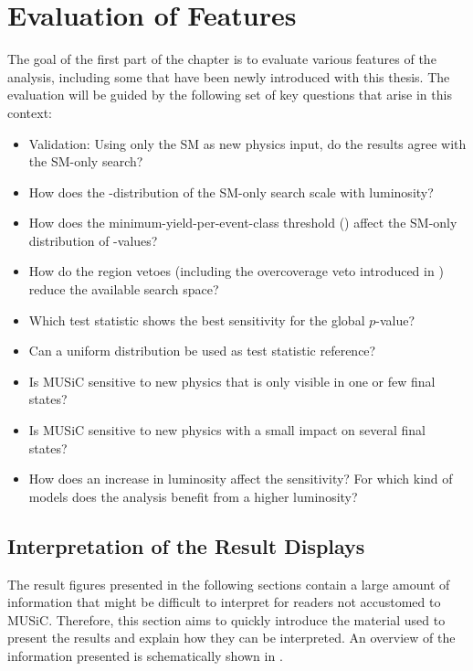 \section{Evaluation of Features}
The goal of the first part of the chapter is to evaluate various features of the analysis, including some that have been newly introduced with this thesis. The evaluation will be guided by the following set of key questions that arise in this context:
\begin{itemize}
    \setlength{\parskip}{0.5em}
    \setlength{\itemsep}{0ex}
    \item Validation: Using only the \ac{SM} as new physics input, do the results agree with the \ac{SM}-only search?
    \item How does the \ptilde-distribution of the \ac{SM}-only search scale with luminosity?
    \item How does the minimum-yield-per-event-class threshold () affect the \ac{SM}-only distribution of \ptilde-values?
    \item How do the region vetoes (including the overcoverage veto introduced in ) reduce the available search space?
    \item Which test statistic \TSphat shows the best sensitivity for the global $p$-value?
    \item Can a uniform distribution be used as test statistic reference?
    \item Is \ac{MUSiC} sensitive to new physics that is only visible in one or few final states?
    \item Is \ac{MUSiC} sensitive to new physics with a small impact on several final states?    
    \item How does an increase in luminosity affect the sensitivity? For which kind of models does the analysis benefit from a higher luminosity?
\end{itemize}

\subsection{Interpretation of the Result Displays}
\label{sec:how_to_read_plots}

The result figures presented in the following sections contain a large amount of information that might be difficult to interpret for readers not accustomed to \ac{MUSiC}. Therefore, this section aims to quickly introduce the material used to present the results and explain how they can be interpreted. An overview of the information presented is schematically shown in .

